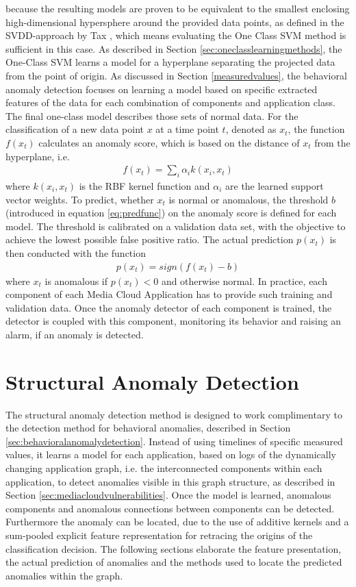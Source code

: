 \documentclass{llncs}
\begin{document}
because the resulting models are proven to be equivalent to the smallest enclosing high-dimensional hypersphere around the provided data points, as defined in the SVDD-approach by Tax \cite{tax2004support}, which means evaluating the One Class SVM method is sufficient in this case. As described in Section \ref{sec:oneclasslearningmethods}, the One-Class SVM learns a model for a hyperplane separating the projected data from the point of origin. 
As discussed in Section \ref{measuredvalues}, the behavioral anomaly detection
focuses on learning a model based on specific extracted features of the data for each combination of components and application class. The final one-class model describes those sets of normal data. For the classification of a new data point $x$ at a time point $t$, denoted as $x_t$,  the function $f(x_t)$ calculates an anomaly score, which is based on the distance of $x_t$ from the hyperplane, i.e. 
\begin{align}
f(x_t) = \sum_i \alpha_i k(x_i, x_t)
\end{align}
where $k(x_i, x_t)$ is the RBF kernel function and $\alpha_i$ are the learned support vector weights.  
To predict, whether $x_t$ is normal or anomalous, the threshold $b$ (introduced in equation \eqref{eq:predfunc}) on the anomaly score is defined for each model. The threshold is calibrated on a validation data set, with the objective to achieve the lowest possible false positive ratio. The actual prediction $p(x_t)$ is then conducted with the function 
\begin{align}
p(x_t) = sign(f(x_t)-b)
\end{align}
where $x_t$ is anomalous if $p(x_t)<0$ and otherwise normal. In practice, each component of each Media Cloud Application has to provide such training and validation data. Once the anomaly detector of each component is trained, the detector is coupled with this component, monitoring its behavior and raising an alarm, if an anomaly is detected. \section{Structural Anomaly Detection}
\label{sec:structuralanomalydetection}
The structural anomaly detection method is designed to work complimentary to the detection method for behavioral anomalies, described in Section \ref{sec:behavioralanomalydetection}. Instead of using timelines of specific measured values, it learns a model for each application, based on logs of the dynamically changing application graph, i.e. the interconnected components within each application, to detect anomalies visible in this graph structure, as described in Section \ref{sec:mediacloudvulnerabilities}. Once the model is learned, anomalous components and anomalous connections between components can be detected. Furthermore the anomaly can be located, due to the use of additive kernels and a sum-pooled explicit feature representation for retracing the origins of the classification decision.
The following sections elaborate the feature presentation, the actual prediction of anomalies and the methods used to locate the predicted anomalies within the graph.
\end{document}
